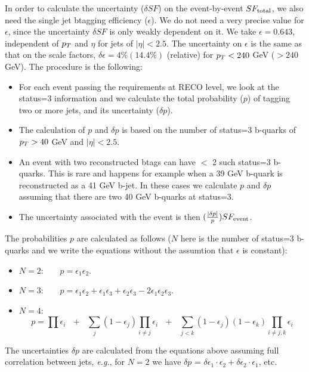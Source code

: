 In order to calculate the uncertainty ($\delta SF$) on the event-by-event $SF_{\rm total}$,
we also need the single jet btagging efficiency ($\epsilon$).  
We do not need a very precise value for $\epsilon$, since the uncertainty $\delta SF$ is 
only weakly dependent on it.  We take $\epsilon = 0.643$, independent of $p_T$
and $\eta$ for jets of $|\eta| < 2.5$.  The uncertainty on $\epsilon$ is 
the same as that on the scale factors, $\delta \epsilon = 4\% (14.4\%)$ (relative)
for $p_T < 240$ GeV ($> 240$ GeV).
The procedure is the following:
\begin{itemize}

\item For each event passing the requirements at RECO level, we look at the status=3 information
and we calculate the total probability ($p$) of tagging two or more jets, and 
its uncertainty ($\delta p$).

\item The calculation of $p$ and $\delta p$ is based on the number of status=3 b-quarks
of $p_T > 40$ GeV and $|\eta| < 2.5$.  

\item An event with two reconstructed btags can have $<$ 2 such status=3 b-quarks.  This 
is rare and happens for example when a 39 GeV b-quark is reconstructed as a 41 GeV
b-jet.  In these cases we calculate $p$ and $\delta p$ assuming that there are 
two 40 GeV b-quarks at status=3.

\item The uncertainty associated with the event is then $(\frac{|\delta p|}{p}) SF_{\rm event}$.

\end{itemize}

The probabilities $p$ are calculated as follows ($N$ here is the number of status=3 b-quarks
and we write the equations without the assumtion that $\epsilon$ is constant):

\begin{itemize}

\item $N=2$:~~~~$p = \epsilon_1 \epsilon_2$.

\item $N=3$:~~~~$p = \epsilon_1 \epsilon_2 + \epsilon_1 \epsilon_3 + \epsilon_2 \epsilon_3 -
2\epsilon_1 \epsilon_2 \epsilon_3$.

\item $N=4$:~~~~$$p = \prod{\epsilon_i}~~~+~~~\sum_j{(1-\epsilon_j)\prod_{i \ne j}{\epsilon_i}}
~~~+~~~\sum_{j<k}{(1-\epsilon_j)(1-\epsilon_k)\prod_{i \ne j,k}{\epsilon_i}}$$



\end{itemize}

The uncertainties $\delta p$ are calculated from the equations above assuming full 
correlation between jets, {\em e.g.}, for $N=2$ we have 
$\delta p$ = $\delta \epsilon_1 \cdot \epsilon_2 + \delta \epsilon_2 \cdot \epsilon_1$, etc.

